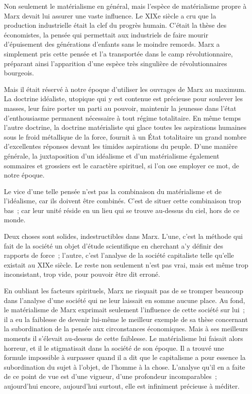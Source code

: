 \documentclass[french,twoside]{book} %
\begin{document}
Non seulement le matérialisme en général, mais l'espèce de matérialisme propre à Marx devait lui assurer une vaste influence. Le XIXe siècle a cru que la production industrielle était la clef du progrès humain. C'était la thèse des économistes, la pensée qui permettait aux industriels de faire mourir d'épuisement des générations d'enfants sans le moindre remords. Marx a simplement pris cette pensée et l'a transportée dans le camp révolutionnaire, préparant ainsi l'apparition d'une espèce très singulière de révolutionnaires bourgeois.\par
Mais il était réservé à notre époque d'utiliser les ouvrages de Marx au maximum. La doctrine idéaliste, utopique qui y est contenue est précieuse pour soulever les masses, leur faire porter un parti au pouvoir, maintenir la jeunesse dans l'état d'enthousiasme permanent nécessaire à tout régime totalitaire. En même temps l'autre doctrine, la doctrine matérialiste qui glace toutes les aspirations humaines sous le froid métallique de la force, fournit à un État totalitaire un grand nombre d'excellentes réponses devant les timides aspirations du peuple. D'une manière générale, la juxtaposition d'un idéalisme et d'un matérialisme également sommaires et grossiers est le caractère spirituel, si l'on ose employer ce mot, de notre époque.\par
Le vice d'une telle pensée n'est pas la combinaison du matérialisme et de l'idéalisme, car ils doivent être combinés. C'est de situer cette combinaison trop bas ; car leur unité réside en un lieu qui se trouve au-dessus du ciel, hors de ce monde.\par
Deux choses sont solides, indestructibles dans Marx. L'une, c'est la méthode qui fait de la société un objet d'étude scientifique en cherchant a'y définir des rapports de force ; l'autre, c'est l'analyse de la société capitaliste telle qu'elle existait au XIXe siècle. Le reste non seulement n'est pas vrai, mais est même trop inconsistant, trop vide, pour pouvoir être dit erroné.\par
En oubliant les facteurs spirituels, Marx ne risquait pas de se tromper beaucoup dans l'analyse d'une société qui ne leur laissait en somme aucune place. Au fond, le matérialisme de Marx exprimait seulement l’influence de cette société sur lui ; il a eu la faiblesse de devenir lui-même le meilleur exemple de sa thèse concernant la subordination de la pensée aux circonstances économiques. Mais à ses meilleurs moments il s'élevait au-dessus de cette faiblesse. Le matérialisme lui faisait alors horreur, et il le stigmatisait dans la société de son époque. Il a trouvé une formule impossible à surpasser quand il a dit que le capitalisme a pour essence la subordination du sujet à l'objet, de l'homme à la chose. L'analyse qu'il en a faite de ce point de vue est d'une vigueur, d'une profondeur incomparables ; aujourd'hui encore, aujourd'hui surtout, elle est infiniment précieuse à méditer.\par
\end{document}
